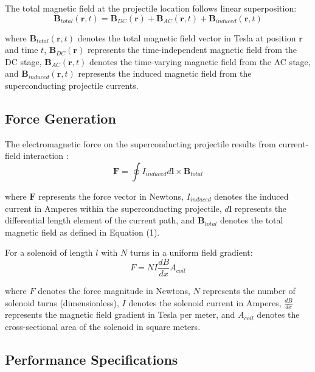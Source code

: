 \documentclass[12pt,a4paper]{article}
\begin{document}
The total magnetic field at the projectile location follows linear superposition:
\begin{equation}
\mathbf{B}_{total}(\mathbf{r},t) = \mathbf{B}_{DC}(\mathbf{r}) + \mathbf{B}_{AC}(\mathbf{r},t) + \mathbf{B}_{induced}(\mathbf{r},t)
\end{equation}

where $\mathbf{B}_{total}(\mathbf{r},t)$ denotes the total magnetic field vector in Tesla at position $\mathbf{r}$ and time $t$, $\mathbf{B}_{DC}(\mathbf{r})$ represents the time-independent magnetic field from the DC stage, $\mathbf{B}_{AC}(\mathbf{r},t)$ denotes the time-varying magnetic field from the AC stage, and $\mathbf{B}_{induced}(\mathbf{r},t)$ represents the induced magnetic field from the superconducting projectile currents.

\subsection{Force Generation}

The electromagnetic force on the superconducting projectile results from current-field interaction \cite{jackson1999}:
\begin{equation}
\mathbf{F} = \oint I_{induced} d\mathbf{l} \times \mathbf{B}_{total}
\end{equation}

where $\mathbf{F}$ represents the force vector in Newtons, $I_{induced}$ denotes the induced current in Amperes within the superconducting projectile, $d\mathbf{l}$ represents the differential length element of the current path, and $\mathbf{B}_{total}$ denotes the total magnetic field as defined in Equation (1).

For a solenoid of length $l$ with $N$ turns in a uniform field gradient:
\begin{equation}
F = NI\frac{dB}{dx}A_{coil}
\end{equation}

where $F$ denotes the force magnitude in Newtons, $N$ represents the number of solenoid turns (dimensionless), $I$ denotes the solenoid current in Amperes, $\frac{dB}{dx}$ represents the magnetic field gradient in Tesla per meter, and $A_{coil}$ denotes the cross-sectional area of the solenoid in square meters.

\subsection{Performance Specifications}
\end{document}
